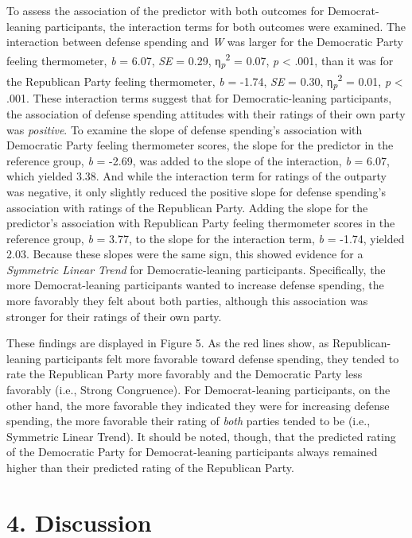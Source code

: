 \documentclass[authordate, meta]{jote-new-article}
\begin{document}
	To assess the association of the predictor with both outcomes for Democrat-leaning participants, the interaction terms for both outcomes were examined. The interaction between defense spending and \emph{W} was larger for the Democratic Party feeling thermometer, \emph{b} = 6.07, \emph{SE} = 0.29, η\textsubscript{\emph{p}}\textsuperscript{2} = 0.07, \emph{p }< .001, than it was for the Republican Party feeling thermometer, \emph{b} = -1.74, \emph{SE} = 0.30, η\textsubscript{\emph{p}}\textsuperscript{2} = 0.01​, \emph{p }< .001. These interaction terms suggest that for Democratic-leaning participants, the association of defense spending attitudes with their ratings of their own party was \emph{positive}. To examine the slope of defense spending's association with Democratic Party feeling thermometer scores, the slope for the predictor in the reference group, \emph{b }= -2.69, was added to the slope of the interaction, \emph{b }= 6.07, which yielded 3.38. And while the interaction term for ratings of the outparty was negative, it only slightly reduced the positive slope for defense spending's association with ratings of the Republican Party. Adding the slope for the predictor's association with Republican Party feeling thermometer scores in the reference group, \emph{b }= 3.77, to the slope for the interaction term, \emph{b }= -1.74, yielded 2.03. Because these slopes were the same sign, this showed evidence for a \emph{Symmetric Linear Trend }for Democratic-leaning participants. Specifically, the more Democrat-leaning participants wanted to increase defense spending, the more favorably they felt about both parties, although this association was stronger for their ratings of their own party.



	These findings are displayed in Figure 5. As the red lines show, as Republican-leaning participants felt more favorable toward defense spending, they tended to rate the Republican Party more favorably and the Democratic Party less favorably (i.e., Strong Congruence). For Democrat-leaning participants, on the other hand, the more favorable they indicated they were for increasing defense spending, the more favorable their rating of \emph{both }parties tended to be (i.e., Symmetric Linear Trend). It should be noted, though, that the predicted rating of the Democratic Party for Democrat-leaning participants always remained higher than their predicted rating of the Republican Party.



	\section{4. Discussion}
\end{document}
